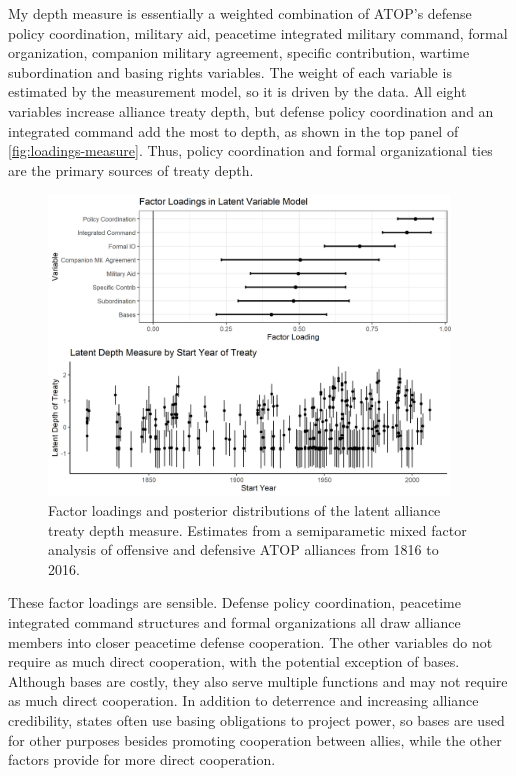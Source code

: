 \documentclass[12pt]{article}
\begin{document}
My depth measure is essentially a weighted combination of ATOP's defense policy coordination, military aid, peacetime integrated military command, formal organization, companion military agreement, specific contribution, wartime subordination and basing rights variables.
The weight of each variable is estimated by the measurement model, so it is driven by the data.  
All eight variables increase alliance treaty depth, but defense policy coordination and an integrated command add the most to depth, as shown in the top panel of \autoref{fig:loadings-measure}. 
Thus, policy coordination and formal organizational ties are the primary sources of treaty depth. 


\begin{figure}[hbtp]
\centering
\includegraphics[width=0.95\textwidth]{../figures/loadings-measure.png}
\caption{Factor loadings and posterior distributions of the latent alliance treaty depth measure. Estimates from a semiparametic mixed factor analysis of offensive and defensive ATOP alliances from 1816 to 2016.}
\label{fig:loadings-measure}
\end{figure}


These factor loadings are sensible. 
Defense policy coordination, peacetime integrated command structures and formal organizations all draw alliance members into closer peacetime defense cooperation. 
The other variables do not require as much direct cooperation, with the potential exception of bases.
Although bases are costly, they also serve multiple functions and may not require as much direct cooperation. 
In addition to deterrence and increasing alliance credibility, states often use basing obligations to project power, so bases are used for other purposes besides promoting cooperation between allies, while the other factors provide for more direct cooperation.  
\end{document}
